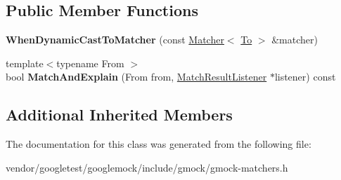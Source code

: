 \subsection*{Public Member Functions}
\begin{DoxyCompactItemize}
\item 
\mbox{\label{classtesting_1_1internal_1_1_when_dynamic_cast_to_matcher_a44e444d218197f8180c5ac7fca135f9a}} 
{\bfseries When\+Dynamic\+Cast\+To\+Matcher} (const \mbox{\hyperlink{classtesting_1_1_matcher}{Matcher}}$<$ \mbox{\hyperlink{classtesting_1_1internal_1_1_to}{To}} $>$ \&matcher)
\item 
\mbox{\label{classtesting_1_1internal_1_1_when_dynamic_cast_to_matcher_a270f6a1e6ad7c9b69fdefca27c513bf5}} 
{\footnotesize template$<$typename From $>$ }\\bool {\bfseries Match\+And\+Explain} (From from, \mbox{\hyperlink{classtesting_1_1_match_result_listener}{Match\+Result\+Listener}} $\ast$listener) const
\end{DoxyCompactItemize}
\subsection*{Additional Inherited Members}


The documentation for this class was generated from the following file\+:\begin{DoxyCompactItemize}
\item 
vendor/googletest/googlemock/include/gmock/gmock-\/matchers.\+h\end{DoxyCompactItemize}
